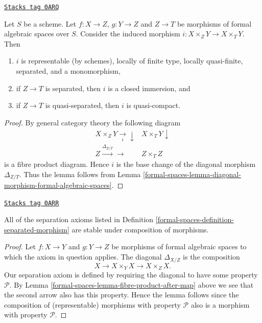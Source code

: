 \begin{lemma}
\label{formal-spaces-lemma-fibre-product-after-map}
\href{https://stacks.math.columbia.edu/tag/0ARQ}{\texttt{Stacks tag 0ARQ}}

Let $S$ be a scheme. Let $f : X \to Z$, $g : Y \to Z$ and $Z \to T$
be morphisms of formal algebraic spaces over $S$. Consider the induced
morphism $i : X \times_Z Y \to X \times_T Y$. Then
\begin{enumerate}
\item $i$ is representable (by schemes), locally of finite type,
locally quasi-finite, separated, and a monomorphism,
\item if $Z \to T$ is separated, then $i$ is a closed immersion, and
\item if $Z \to T$ is quasi-separated, then $i$ is quasi-compact.
\end{enumerate}
\end{lemma}

\begin{proof}
By general category theory the following diagram
$$
\begin{array}{cc}X \times_Z Y \underset{i}{\longrightarrow}\downarrow & X \times_T Y \downarrow \\ Z \overset{\Delta_{Z/T}}{\longrightarrow}\longrightarrow & Z \times_T Z\end{array}
$$
is a fibre product diagram. Hence $i$ is the base change of the
diagonal morphism $\Delta_{Z/T}$. Thus the lemma follows
from Lemma \ref{formal-spaces-lemma-diagonal-morphism-formal-algebraic-spaces}.
\end{proof}

\begin{lemma}
\label{formal-spaces-lemma-composition-separated}
\href{https://stacks.math.columbia.edu/tag/0ARR}{\texttt{Stacks tag 0ARR}}

All of the separation axioms listed in
Definition \ref{formal-spaces-definition-separated-morphism}
are stable under composition of morphisms.
\end{lemma}

\begin{proof}
Let $f : X \to Y$ and $g : Y \to Z$ be morphisms of formal algebraic spaces
to which the axiom in question applies.
The diagonal $\Delta_{X/Z}$ is the composition
$$
X \longrightarrow X \times_Y X \longrightarrow X \times_Z X.
$$
Our separation axiom is defined by requiring the diagonal
to have some property $\mathcal{P}$. By
Lemma \ref{formal-spaces-lemma-fibre-product-after-map} above we see that
the second arrow also has this property. Hence the lemma follows
since the composition of (representable) morphisms with property
$\mathcal{P}$ also is a morphism with property $\mathcal{P}$.
\end{proof}

